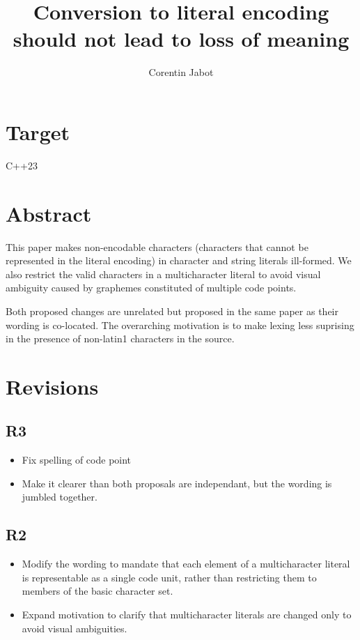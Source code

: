 \documentclass{wg21}
\title{Conversion to literal encoding should not lead to loss of meaning}
\author{Corentin Jabot}{corentin.jabot@gmail.com}
\begin{document}
    \maketitle


    \section{Target}

    C++23

    \section{Abstract}

    This paper makes non-encodable characters (characters that cannot be represented in the literal encoding) in character and string literals ill-formed.
    We also restrict the valid characters in a multicharacter literal to avoid visual ambiguity caused by graphemes constituted of multiple code points.

    Both proposed changes are unrelated but proposed in the same paper as their wording is co-located.
    The overarching motivation is to make lexing less suprising in the presence of non-latin1 characters in the source.

    \section{Revisions}
    \subsection{R3}
    \begin{itemize}
        \item Fix spelling of code point
        \item Make it clearer than both proposals are independant, but the wording is jumbled together.
    \end{itemize}

    \subsection{R2}
    \begin{itemize}
        \item Modify the wording to mandate that each element of a multicharacter literal is representable as a single code unit,
        rather than restricting them to members of the basic character set.
        \item Expand motivation to clarify that multicharacter literals are changed only to avoid visual ambiguities.
    \end{itemize}
\end{document}
